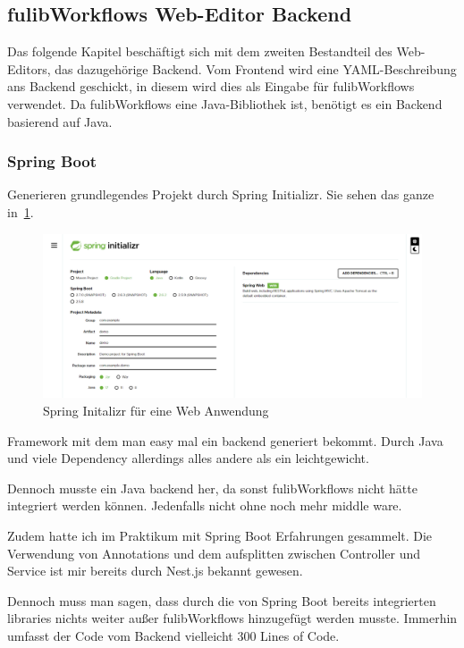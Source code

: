 \subsection{fulibWorkflows Web-Editor Backend}\label{subsec:backend}
Das folgende Kapitel beschäftigt sich mit dem zweiten Bestandteil des Web-Editors, das dazugehörige Backend.
Vom Frontend wird eine YAML-Beschreibung ans Backend geschickt, in diesem wird dies als Eingabe für fulibWorkflows verwendet.
Da fulibWorkflows eine Java-Bibliothek ist, benötigt es ein Backend basierend auf Java.

\subsubsection{Spring Boot}


Generieren grundlegendes Projekt durch Spring Initializr.\cite*{sbinit}
Sie sehen das ganze in~\ref{fig:spring-init}.

\begin{figure}[h]
    \centering
    \includegraphics[width=1.0\textwidth]{images/2.2/spring-init}
    \caption{Spring Initalizr für eine Web Anwendung}
    \label{fig:spring-init}
\end{figure}




Framework mit dem man easy mal ein backend generiert bekommt.
Durch Java und viele Dependency allerdings alles andere als ein leichtgewicht.

Dennoch musste ein Java backend her, da sonst fulibWorkflows nicht hätte integriert werden können.
Jedenfalls nicht ohne noch mehr middle ware.

Zudem hatte ich im Praktikum mit Spring Boot Erfahrungen gesammelt.
Die Verwendung von Annotations und dem aufsplitten zwischen Controller und Service ist mir bereits
durch Nest.js bekannt gewesen.

Dennoch muss man sagen, dass durch die von Spring Boot bereits integrierten libraries nichts weiter
außer fulibWorkflows hinzugefügt werden musste.
Immerhin umfasst der Code vom Backend vielleicht 300 Lines of Code.
